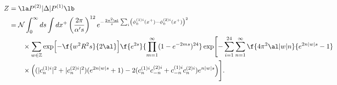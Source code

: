 \begin{equation}
\begin{split}
Z&=\la P^{(2)}|\Delta|P^{(1)} \lb \\
&={\cal N} \int_{0}^{\infty}
 ds \int dx^+ \left(\frac{2 \pi}{\alpha' s}\right)^{12} 
  e^{-\frac{2 \pi^2 \al}{s} \sum_i
 \left(\phi_0^{(1)i}(x^+) - \phi_0^{(2)i} (x^+)\right)^2}
 \\ & \qquad \times
\sum_{w \in {\mathbb Z}}\exp \Bigl[-\f{w^2R^2s}{2\al}\Bigr]
 \f{e^{2s}}{ \prod_{m=1}^{\infty}(1-e^{-2ms})^{24}} 
 \exp \Biggl[-\sum_{i=1}^{24}
\sum_{n=1}^{\infty}\f{4\pi^2 \al |w|n}{e^{2n|w|s}-1} \\ & \qquad \times
\Bigl(
(|c^{(1)i}_n|^2+|c^{(2)i}_n|^2)(e^{2n|w|s}+1)
 -2(c^{(1)i}_n c^{(2)i}_{-n}
+c^{(1)i}_{-n} c^{(2)i}_n) e^{n|w|s}\Bigr)\Biggr] . 
\label{d1p}
\end{split}
\end{equation}

